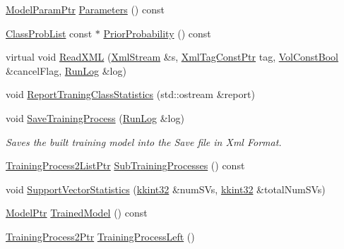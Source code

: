 \begin{DoxyCompactItemize}
\item 
\hyperlink{namespace_k_k_m_l_l_a76c2dec3304f1a2dc2e357872e4fb320}{Model\+Param\+Ptr} \hyperlink{class_k_k_m_l_l_1_1_training_process2_ac8fcf74cb7815cda2495ca358bde7d01}{Parameters} () const 
\item 
\hyperlink{class_k_k_m_l_l_1_1_class_prob_list}{Class\+Prob\+List} const $\ast$ \hyperlink{class_k_k_m_l_l_1_1_training_process2_aa82e1165e117f1a8a3bb288286b814a2}{Prior\+Probability} () const 
\item 
virtual void \hyperlink{class_k_k_m_l_l_1_1_training_process2_acdc15c7892c55af20a72b80d15dee0c0}{Read\+X\+ML} (\hyperlink{class_k_k_b_1_1_xml_stream}{Xml\+Stream} \&s, \hyperlink{namespace_k_k_b_a5f1b0b1667d79fec26deeff10c43df23}{Xml\+Tag\+Const\+Ptr} tag, \hyperlink{namespace_k_k_b_a7d390f568e2831fb76b86b56c87bf92f}{Vol\+Const\+Bool} \&cancel\+Flag, \hyperlink{class_k_k_b_1_1_run_log}{Run\+Log} \&log)
\item 
void \hyperlink{class_k_k_m_l_l_1_1_training_process2_aacbc206806accfe00db4b1058df38cd1}{Report\+Traning\+Class\+Statistics} (std\+::ostream \&report)
\item 
void \hyperlink{class_k_k_m_l_l_1_1_training_process2_a251864b9100b64113649b171b2634900}{Save\+Training\+Process} (\hyperlink{class_k_k_b_1_1_run_log}{Run\+Log} \&log)
\begin{DoxyCompactList}\small\item\em Saves the built training model into the Save file in Xml Format. \end{DoxyCompactList}\item 
\hyperlink{namespace_k_k_m_l_l_a139987ae75e5ba08c76635f8170f858f}{Training\+Process2\+List\+Ptr} \hyperlink{class_k_k_m_l_l_1_1_training_process2_a35c4c95dc376fcafd7b06ce18c47cd67}{Sub\+Training\+Processes} () const 
\item 
void \hyperlink{class_k_k_m_l_l_1_1_training_process2_abd822c97fac4085748de2a322f697bc3}{Support\+Vector\+Statistics} (\hyperlink{namespace_k_k_b_a8fa4952cc84fda1de4bec1fbdd8d5b1b}{kkint32} \&num\+S\+Vs, \hyperlink{namespace_k_k_b_a8fa4952cc84fda1de4bec1fbdd8d5b1b}{kkint32} \&total\+Num\+S\+Vs)
\item 
\hyperlink{namespace_k_k_m_l_l_a5e593621576d583bef55408bd6a3cfd5}{Model\+Ptr} \hyperlink{class_k_k_m_l_l_1_1_training_process2_a3b45254019301f8036794118f3b3419f}{Trained\+Model} () const 
\item 
\hyperlink{class_k_k_m_l_l_1_1_training_process2_a5442e76e1ae2de2e77e3a36b55f98fe4}{Training\+Process2\+Ptr} \hyperlink{class_k_k_m_l_l_1_1_training_process2_a64c457c7a1e3b955027ff8a27aaa7372}{Training\+Process\+Left} ()

\end{DoxyCompactItemize}

